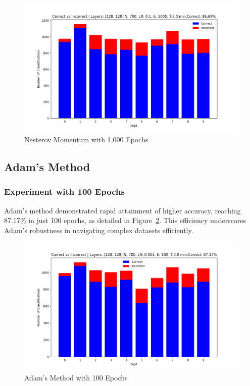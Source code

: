 \documentclass{article}
\begin{document}
\begin{figure}[h!]
    \centering
    \includegraphics[scale=0.5]{../figs/Nes_1000ep.png}
    \caption{Nesterov Momentum with 1,000 Epochs}
    \label{fig:Nes_1000ep}
\end{figure}

\subsection{Adam's Method}

\subsubsection{Experiment with 100 Epochs}
Adam's method demonstrated rapid attainment of higher accuracy, reaching 87.17\% in just 100 epochs, as detailed in Figure~\ref{fig:Adam_100ep}. This efficiency underscores Adam's robustness in navigating complex datasets efficiently.

\begin{figure}[h!]
    \centering
    \includegraphics[scale=0.5]{../figs/Adam_100ep.png}
    \caption{Adam's Method with 100 Epochs}
    \label{fig:Adam_100ep}
\end{figure}
\end{document}
